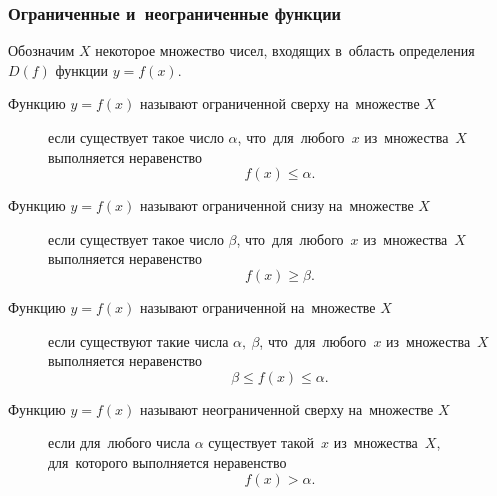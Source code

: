 \documentclass[]{scrartcl}
\begin{document}
{{\subsubsection{Ограниченные и~неограниченные функции}
Обозначим ${\textstyle X}$ некоторое множество чисел, входящих в~область определения  ${\textstyle D(f)}$ функции ${\textstyle y=f(x)}$.
\begin{description}
	\item[Функцию ${\textstyle y=f(x)}$ называют ограниченной сверху на~множестве ${\textstyle X}$] если существует такое число ${\textstyle \alpha}$, что~для~любого~${\textstyle x}$   из~множества~${\textstyle X}$ выполняется неравенство
	\begin{equation}\label{eq:function-1}
	f(x)\leq \alpha.
	\end{equation}
\end{description}
\begin{description}
	\item[Функцию ${\textstyle y=f(x)}$ называют ограниченной снизу на~множестве ${\textstyle X}$] если существует такое число ${\textstyle \beta}$, что~для~любого~${\textstyle x}$   из~множества~${\textstyle X}$ выполняется неравенство
	\begin{equation}\label{eq:function-2}
	f(x)\geq \beta.
	\end{equation}
\end{description}
\begin{description}
	\item[Функцию ${\textstyle y=f(x)}$ называют ограниченной на~множестве ${\textstyle X}$] если существуют такие числа ${\textstyle \alpha,\ \beta}$, что~для~любого~${\textstyle x}$  из~множества~${\textstyle X}$ выполняется неравенство
	\begin{equation}\label{eq:function-3}
	\beta \leq f(x)\leq \alpha.
	\end{equation}
\end{description}
\begin{description}
	\item[Функцию ${\textstyle y=f(x)}$ называют неограниченной сверху на~множестве ${\textstyle X}$] если для~любого числа ${\textstyle \alpha}$ существует такой~${\textstyle x}$  из~множества~${\textstyle X}$, для~которого выполняется неравенство
	\begin{equation}\label{eq:function-4}
	f(x) > \alpha.
	\end{equation}
\end{description}
\begin{description}

\end{description}}}
\end{document}

